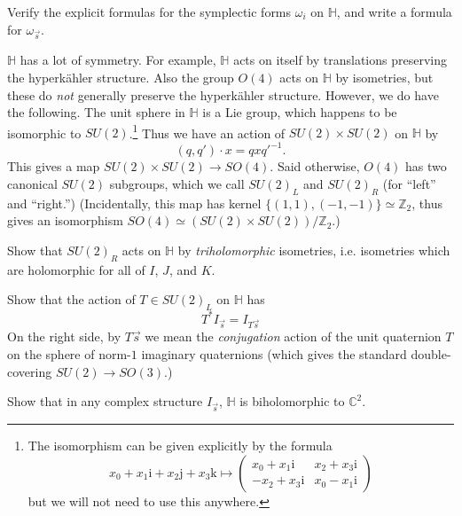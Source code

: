 \documentclass[12pt,letterpaper,reqno]{amsart}
\numberwithin{equation}{section}
\newcommand{\C}{\ensuremath{\mathbb C}}
\newcommand{\Z}{\ensuremath{\mathbb Z}}
\newcommand{\bbH}{\ensuremath{\mathbb H}}
\newcommand{\hk}{hyperk\"ahler\xspace}
\newcommand{\I}{{\mathrm i}}
\newcommand{\J}{{\mathrm j}}
\newcommand{\K}{{\mathrm k}}
\newcommand{\ti}[1]{\textit{#1}}
\begin{document}
\begin{exercise} \label{exc:flat-space-computing}
Verify the explicit formulas for the symplectic forms
$\omega_i$ on $\bbH$, and write a formula for $\omega_{\vec s}$.
\end{exercise}

$\bbH$ has a lot of symmetry. For example, $\bbH$ acts 
on itself by translations preserving the \hk structure.
Also the group $O(4)$ acts on $\bbH$ by isometries, but 
these do \ti{not} generally preserve the \hk structure.
However, we do have the following. The 
unit sphere in ${\mathbb H}$ is a Lie group,
which happens to be isomorphic to $SU(2)$.\footnote{The isomorphism
can be given explicitly by the formula
\begin{equation}
  x_0 + x_1 \I + x_2 \J + x_3 \K \mapsto \begin{pmatrix} x_0+x_1\I & x_2+x_3\I \\ -x_2+x_3\I & x_0-x_1\I \end{pmatrix}
\end{equation}
but we will not need to use this anywhere.}
Thus we have an action of $SU(2) \times SU(2)$ 
on ${\mathbb H}$ by
\begin{equation}
  (q, q') \cdot x = q x q'^{-1}.
\end{equation}
This gives a map $SU(2) \times SU(2) \to SO(4)$.
Said otherwise, $O(4)$ has two canonical $SU(2)$ subgroups,
which we call $SU(2)_L$ and $SU(2)_R$ (for ``left'' and ``right.'')
(Incidentally, this map has kernel $\{(1,1),(-1,-1)\} \simeq \Z_2$, 
thus gives an isomorphism $SO(4) \simeq (SU(2) \times SU(2)) / \Z_2$.)

\begin{exercise} \label{exc:su2r-action}
Show that $SU(2)_R$ acts on $\bbH$ by \ti{triholomorphic} 
isometries, i.e. isometries which are holomorphic for
all of $I$, $J$, and $K$.
\end{exercise}

\begin{exercise} \label{exc:su2l-action}
Show that the action of $T \in SU(2)_L$ on $\bbH$ has
\begin{equation}
  T^* I_{\vec s} = I_{T \vec s}
\end{equation}
On the right side, by $T \vec s$ we mean the \ti{conjugation}
action of the unit quaternion $T$ on the sphere of norm-$1$
imaginary quaternions (which gives the standard double-covering
$SU(2) \to SO(3)$.)
\end{exercise}

\begin{exercise}
Show that in any complex structure
$I_{\vec s}$, $\bbH$ is biholomorphic
to $\C^2$.
\end{exercise}
\end{document}
